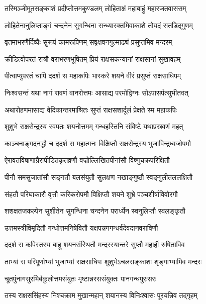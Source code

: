 \twolineshloka
{तस्मिञ्जीमूतसङ्काशं प्रदीप्तोत्तमकुण्डलम्}
{लोहिताक्षं महाबाहुं महारजतवाससम्} %

\twolineshloka
{लोहितेनानुलिप्ताङ्गं चन्दनेन सुगन्धिना}
{सन्ध्यारक्तमिवाकाशे तोयदं सतडिद्गुणम्} %

\twolineshloka
{वृतमाभरणैर्दिव्यैः सुरूपं कामरूपिणम्}
{सवृक्षवनगुल्माढ्यं प्रसुप्तमिव मन्दरम्} %

\twolineshloka
{क्रीडित्वोपरतं रात्रौ वराभरणभूषितम्}
{प्रियं राक्षसकन्यानां राक्षसानां सुखावहम्} %

\twolineshloka
{पीत्वाप्युपरतं चापि ददर्श स महाकपिः}
{भास्करे शयने वीरं प्रसुप्तं राक्षसाधिपम्} %

\twolineshloka
{निःश्वसन्तं यथा नागं रावणं वानरोत्तमः}
{आसाद्य परमोद्विग्नः सोऽपासर्पत्सुभीतवत्} %

\twolineshloka
{अथारोहणमासाद्य वेदिकान्तरमाश्रितः}
{सुप्तं राक्षसशार्दूलं प्रेक्षते स्म महाकपिः} %

\twolineshloka
{शुशुभे राक्षसेन्द्रस्य स्वपतः शयनोत्तमम्}
{गन्धहस्तिनि संविष्टे यथाप्रस्रवणं महत्} %

\twolineshloka
{काञ्चनाङ्गदनद्धौ च ददर्श स महात्मनः}
{विक्षिप्तौ राक्षसेन्द्रस्य भुजाविन्द्रध्वजोपमौ} %

\twolineshloka
{ऐरावतविषाणाग्रैरापीडितकृतव्रणौ}
{वज्रोल्लिखितपीनांसौ विष्णुचक्रपरिक्षितौ} %

\twolineshloka
{पीनौ समसुजातांसौ सङ्गतौ बलसंयुतौ}
{सुलक्षण नखाङ्गुष्ठौ स्वङ्गुलीतललक्षितौ} %

\twolineshloka
{संहतौ परिघाकारौ वृत्तौ करिकरोपमौ}
{विक्षिप्तौ शयने शुभ्रे पञ्चशीर्षाविवोरगौ} %

\twolineshloka
{शशक्षतजकल्पेन सुशीतेन सुगन्धिना}
{चन्दनेन परार्ध्येन स्वनुलिप्तौ स्वलङ्कृतौ} %

\twolineshloka
{उत्तमस्त्रीविमृदितौ गन्धोत्तमनिषेवितौ}
{यक्षपन्नगगन्धर्वदेवदानवराविणौ} %

\twolineshloka
{ददर्श स कपिस्तस्य बाहू शयनसंस्थितौ}
{मन्दरस्यान्तरे सुप्तौ महार्ही रुषिताविव} %

\twolineshloka
{ताभ्यां स परिपूर्णाभ्यां भुजाभ्यां राक्षसाधिपः}
{शुशुभेऽचलसङ्काशः शृङ्गाभ्यामिव मन्दरः} %

\twolineshloka
{चूतपुंनागसुरभिर्बकुलोत्तमसंयुतः}
{मृष्टान्नरससंयुक्तः पानगन्धपुरःसरः} %

\twolineshloka
{तस्य राक्षससिंहस्य निश्चक्राम मुखान्महान्}
{शयानस्य विनिःश्वासः पूरयन्निव तद्गृहम्} %

